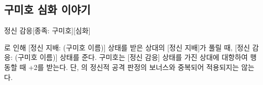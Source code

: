 \documentclass{report}
\begin{document}
	\subsection{구미호 심화 이야기}
	
	\begin{story}{정신 감응}{[종족: 구미호][심화]}
		
		로 인해 [정신 지배: (구미호 이름)] 상태를 받은 상대의 [정신 지배]가 풀릴 때, [정신 감응: (구미호 이름)] 상태를 준다. 구미호는 [정신 감응] 상태를 가진 상대에 대항하여 행동할 때 +2를 받는다. 단, 의 정신적 공격 판정의 보너스와 중복되어 적용되지는 않는다.
		
	\end{story}
	
\end{document}
